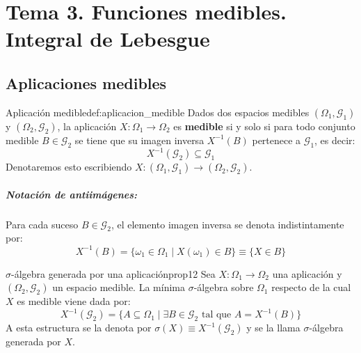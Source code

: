 \chapter*{Tema 3. Funciones medibles. Integral de Lebesgue}
\setcounter{chapter}{3}
\section{Aplicaciones medibles}

\begin{definicion}{Aplicación medible}{def:aplicacion_medible}
Dados dos espacios medibles $(\Omega_1, \mathcal{G}_1)$ y $(\Omega_2, \mathcal{G}_2)$, la aplicación $X : \Omega_1 \to \Omega_2$ es \textbf{medible} si y solo si para todo conjunto medible $B \in \mathcal{G}_2$ se tiene que su imagen inversa $X^{-1}(B)$ pertenece a $\mathcal{G}_1$, es decir:
\[
    X^{-1}(\mathcal{G}_2) \subseteq \mathcal{G}_1
\]
Denotaremos esto escribiendo $X : (\Omega_1, \mathcal{G}_1) \to (\Omega_2, \mathcal{G}_2)$.
\end{definicion}

\paragraph{Notación de antiimágenes:}
Para cada suceso $B \in \mathcal{G}_2$, el elemento imagen inversa se denota indistintamente por:
\[
    X^{-1}(B) = \{ \omega_1 \in \Omega_1 \mid X(\omega_1) \in B \} \equiv \{ X \in B \}
\]

\begin{proposicion}{$\sigma$-álgebra generada por una aplicación}{prop12}
Sea $X : \Omega_1 \to \Omega_2$ una aplicación y $(\Omega_2, \mathcal{G}_2)$ un espacio medible. La mínima $\sigma$-álgebra sobre $\Omega_1$ respecto de la cual $X$ es medible viene dada por:
\[
    X^{-1}(\mathcal{G}_2) = \{ A \subseteq \Omega_1 \mid \exists B \in \mathcal{G}_2 \text{ tal que } A = X^{-1}(B) \}
\]
A esta estructura se la denota por $\sigma(X) \equiv X^{-1}(\mathcal{G}_2)$ y se la llama $\sigma$-álgebra generada por $X$.
\end{proposicion}

